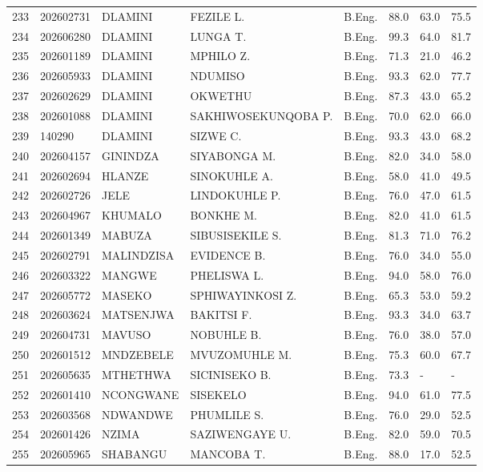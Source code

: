 \documentclass[12pt]{article}
\begin{document}
\begin{longtable}{@{}llllllll@{}}
233 & 202602731 & DLAMINI & FEZILE L. & B.Eng. & 88.0 & 63.0 & 75.5 \\
234 & 202606280 & DLAMINI & LUNGA T. & B.Eng. & 99.3 & 64.0 & 81.7 \\
235 & 202601189 & DLAMINI & MPHILO Z. & B.Eng. & 71.3 & 21.0 & 46.2 \\
236 & 202605933 & DLAMINI & NDUMISO & B.Eng. & 93.3 & 62.0 & 77.7 \\
237 & 202602629 & DLAMINI & OKWETHU & B.Eng. & 87.3 & 43.0 & 65.2 \\
238 & 202601088 & DLAMINI & SAKHIWOSEKUNQOBA P. & B.Eng. & 70.0 & 62.0 & 66.0 \\
239 & 140290 & DLAMINI & SIZWE C. & B.Eng. & 93.3 & 43.0 & 68.2 \\
240 & 202604157 & GININDZA & SIYABONGA M. & B.Eng. & 82.0 & 34.0 & 58.0 \\
241 & 202602694 & HLANZE & SINOKUHLE A. & B.Eng. & 58.0 & 41.0 & 49.5 \\
242 & 202602726 & JELE & LINDOKUHLE P. & B.Eng. & 76.0 & 47.0 & 61.5 \\
243 & 202604967 & KHUMALO & BONKHE M. & B.Eng. & 82.0 & 41.0 & 61.5 \\
244 & 202601349 & MABUZA & SIBUSISEKILE S. & B.Eng. & 81.3 & 71.0 & 76.2 \\
245 & 202602791 & MALINDZISA & EVIDENCE B. & B.Eng. & 76.0 & 34.0 & 55.0 \\
246 & 202603322 & MANGWE & PHELISWA L. & B.Eng. & 94.0 & 58.0 & 76.0 \\
247 & 202605772 & MASEKO & SPHIWAYINKOSI Z. & B.Eng. & 65.3 & 53.0 & 59.2 \\
248 & 202603624 & MATSENJWA & BAKITSI F. & B.Eng. & 93.3 & 34.0 & 63.7 \\
249 & 202604731 & MAVUSO & NOBUHLE B. & B.Eng. & 76.0 & 38.0 & 57.0 \\
250 & 202601512 & MNDZEBELE & MVUZOMUHLE M. & B.Eng. & 75.3 & 60.0 & 67.7 \\
251 & 202605635 & MTHETHWA & SICINISEKO B. & B.Eng. & 73.3 & - & - \\
252 & 202601410 & NCONGWANE & SISEKELO & B.Eng. & 94.0 & 61.0 & 77.5 \\
253 & 202603568 & NDWANDWE & PHUMLILE S. & B.Eng. & 76.0 & 29.0 & 52.5 \\
254 & 202601426 & NZIMA & SAZIWENGAYE U. & B.Eng. & 82.0 & 59.0 & 70.5 \\
255 & 202605965 & SHABANGU & MANCOBA T. & B.Eng. & 88.0 & 17.0 & 52.5 \\

\end{longtable}
\end{document}
